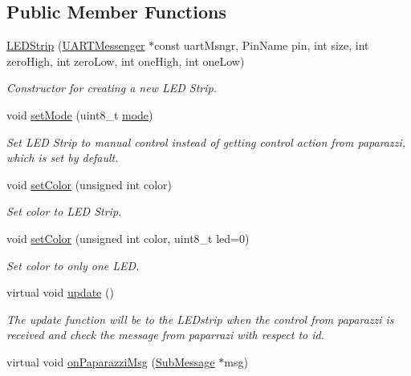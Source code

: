 \subsection*{Public Member Functions}
\begin{DoxyCompactItemize}
\item 
\hyperlink{class_l_e_d_strip_a746e420e05c5d6c45eb2f74eaf5928fc}{L\+E\+D\+Strip} (\hyperlink{class_u_a_r_t_messenger}{U\+A\+R\+T\+Messenger} $\ast$const uart\+Msngr, Pin\+Name pin, int size, int zero\+High, int zero\+Low, int one\+High, int one\+Low)
\begin{DoxyCompactList}\small\item\em Constructor for creating a new L\+ED Strip. \end{DoxyCompactList}\item 
void \hyperlink{class_l_e_d_strip_abf199367f3caaf9730262c4e7bef6bc1}{set\+Mode} (uint8\+\_\+t \hyperlink{class_l_e_d_strip_ac209f99d6a633cd4c672fc16a991f4f8}{mode})
\begin{DoxyCompactList}\small\item\em Set L\+ED Strip to manual control instead of getting control action from paparazzi, which is set by default. \end{DoxyCompactList}\item 
void \hyperlink{class_l_e_d_strip_a310b381acdd83a01ddb6e2debebbbc7c}{set\+Color} (unsigned int color)
\begin{DoxyCompactList}\small\item\em Set color to L\+ED Strip. \end{DoxyCompactList}\item 
void \hyperlink{class_l_e_d_strip_a1f9d9c2784c9ad893163f7f17e603ce7}{set\+Color} (unsigned int color, uint8\+\_\+t led=0)
\begin{DoxyCompactList}\small\item\em Set color to only one L\+ED. \end{DoxyCompactList}\item 
virtual void \hyperlink{class_l_e_d_strip_abc57d90870bb0e9c0d05e7ba6ca76c95}{update} ()
\begin{DoxyCompactList}\small\item\em The update function will be to the L\+E\+Dstrip when the control from paparazzi is received and check the message from paparrazi with respect to id. \end{DoxyCompactList}\item 
virtual void \hyperlink{class_l_e_d_strip_af9708cc14c0e3f75e5b3c268b398f436}{on\+Paparazzi\+Msg} (\hyperlink{struct_sub_message}{Sub\+Message} $\ast$msg)

\end{DoxyCompactItemize}
